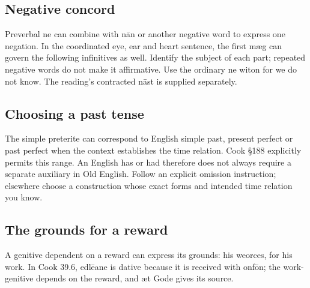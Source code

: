 \subsection*{Negative concord}

Preverbal ne can combine with nān or another negative word to express one negation. In the coordinated eye, ear and heart sentence, the first mæg can govern the following infinitives as well. Identify the subject of each part; repeated negative words do not make it affirmative. Use the ordinary ne witon for we do not know. The reading’s contracted nāst is supplied separately.

\subsection*{Choosing a past tense}

The simple preterite can correspond to English simple past, present perfect or past perfect when the context establishes the time relation. Cook §188 explicitly permits this range. An English has or had therefore does not always require a separate auxiliary in Old English. Follow an explicit omission instruction; elsewhere choose a construction whose exact forms and intended time relation you know.

\subsection*{The grounds for a reward}

A genitive dependent on a reward can express its grounds: his weorces, for his work. In Cook 39.6, edlēane is dative because it is received with onfōn; the work-genitive depends on the reward, and æt Gode gives its source.

